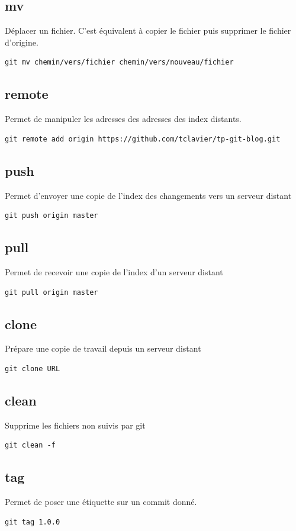 \documentclass[a4paper]{article}
\begin{document}
\subsection*{mv}
Déplacer un fichier. C'est équivalent à copier le fichier puis supprimer le fichier d'origine.
\begin{verbatim}
git mv chemin/vers/fichier chemin/vers/nouveau/fichier
\end{verbatim}

\subsection*{remote}
Permet de manipuler les adresses des adresses des index distants.
\begin{verbatim}
git remote add origin https://github.com/tclavier/tp-git-blog.git
\end{verbatim}

\subsection*{push}
Permet d'envoyer une copie de l'index des changements vers un serveur distant
\begin{verbatim}
git push origin master
\end{verbatim}

\subsection*{pull}
Permet de recevoir une copie de l'index d'un serveur distant
\begin{verbatim}
git pull origin master
\end{verbatim}

\subsection*{clone}
Prépare une copie de travail depuis un serveur distant
\begin{verbatim}
git clone URL
\end{verbatim}

\subsection*{clean}
Supprime les fichiers non suivis par git
\begin{verbatim}
git clean -f
\end{verbatim}

\subsection*{tag}
Permet de poser une étiquette sur un commit donné.
\begin{verbatim}
git tag 1.0.0
\end{verbatim}
\end{document}
